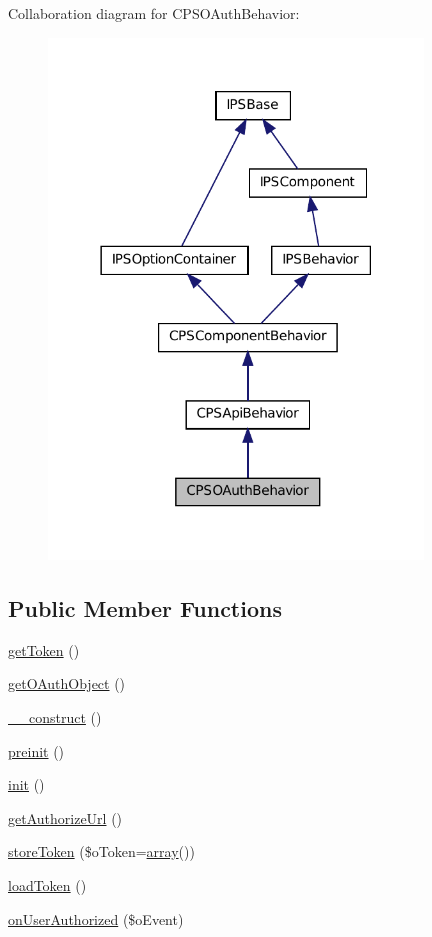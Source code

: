 Collaboration diagram for CPSOAuthBehavior:\nopagebreak
\begin{figure}[H]
\begin{center}
\leavevmode
\includegraphics[width=282pt]{classCPSOAuthBehavior__coll__graph}
\end{center}
\end{figure}
\subsection*{Public Member Functions}
\begin{DoxyCompactItemize}
\item 
\hyperlink{classCPSOAuthBehavior_a211a2979c22afcd7d9056a2bb55aa449}{getToken} ()
\item 
\hyperlink{classCPSOAuthBehavior_a13fb41e10ef1a77aacb14d33ac1ce1be}{getOAuthObject} ()
\item 
\hyperlink{classCPSOAuthBehavior_a095c5d389db211932136b53f25f39685}{\_\-\_\-construct} ()
\item 
\hyperlink{classCPSOAuthBehavior_a2dc262e99b1c246b56f27626bfe699ff}{preinit} ()
\item 
\hyperlink{classCPSOAuthBehavior_a4be4055f3361d4800e16bc2e2e38cda6}{init} ()
\item 
\hyperlink{classCPSOAuthBehavior_a94d630cf8cc55a8a7929862d81e3a6ab}{getAuthorizeUrl} ()
\item 
\hyperlink{classCPSOAuthBehavior_ab53bf3a3bd85d4b1bef5f84fd9b1527c}{storeToken} (\$oToken=\hyperlink{list_8php_aa3205d038c7f8feb5c9f01ac4dfadc88}{array}())
\item 
\hyperlink{classCPSOAuthBehavior_a5126349c471fcaff1a74b9d117b979b1}{loadToken} ()
\item 
\hyperlink{classCPSOAuthBehavior_aa2ddabcd9b27c0cec44f886ea1ded176}{onUserAuthorized} (\$oEvent)
\end{DoxyCompactItemize}
